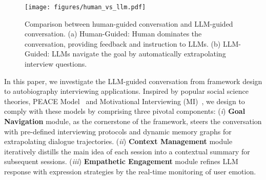 \begin{figure*}[t]
    \centering
    \texttt{[image: figures/human\_vs\_llm.pdf]}
    \caption{Comparison between human-guided conversation and LLM-guided conversation. (a) Human-Guided: Human dominates the conversation, providing feedback and instruction to LLMs. (b) LLM-Guided: LLMs navigate the goal by automatically extrapolating interview questions.}
    \label{fig:human_guided_vs_llm_guided}
    \vspace{-5mm}
\end{figure*}

In this paper, we investigate the LLM-guided conversation from framework design to autobiography interviewing applications. 
Inspired by popular social science theories, PEACE Model~\cite{clarke2001national} and Motivational Interviewing (MI)~\cite{hettema2005motivational}, we design
\methodname to comply with these models by comprising three pivotal components: (\textit{i}) \textbf{Goal Navigation} module, as the cornerstone of the framework, steers the conversation with pre-defined interviewing protocols and dynamic memory graphs for extrapolating dialogue trajectories. (\textit{ii}) \textbf{Context Management} module iteratively distills the main idea of each session into a contextual summary for subsequent sessions.
(\textit{iii}) \textbf{Empathetic Engagement} module refines LLM response with expression strategies by the real-time monitoring of user emotion. 

